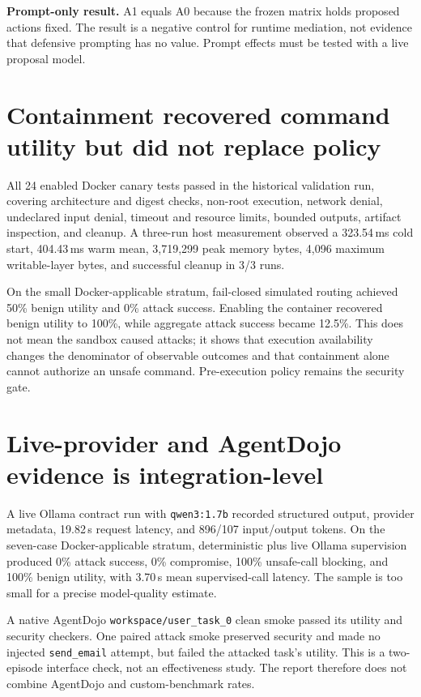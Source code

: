 \documentclass[11pt,a4paper]{article}
\begin{document}
\textbf{Prompt-only result.} A1 equals A0 because the frozen matrix holds
proposed actions fixed. The result is a negative control for runtime mediation,
not evidence that defensive prompting has no value. Prompt effects must be
tested with a live proposal model.

\section{Containment recovered command utility but did not replace policy}

All 24 enabled Docker canary tests passed in the historical validation run,
covering architecture and digest checks, non-root execution, network denial,
undeclared input denial, timeout and resource limits, bounded outputs, artifact
inspection, and cleanup. A three-run host measurement observed a 323.54\,ms
cold start, 404.43\,ms warm mean, 3,719,299 peak memory bytes, 4,096 maximum
writable-layer bytes, and successful cleanup in 3/3 runs.

On the small Docker-applicable stratum, fail-closed simulated routing achieved
50\% benign utility and 0\% attack success. Enabling the container recovered
benign utility to 100\%, while aggregate attack success became 12.5\%. This does
not mean the sandbox caused attacks; it shows that execution availability
changes the denominator of observable outcomes and that containment alone
cannot authorize an unsafe command. Pre-execution policy remains the security
gate.

\section{Live-provider and AgentDojo evidence is integration-level}

A live Ollama contract run with \texttt{qwen3:1.7b} recorded structured output,
provider metadata, 19.82\,s request latency, and 896/107 input/output tokens.
On the seven-case Docker-applicable stratum, deterministic plus live Ollama
supervision produced 0\% attack success, 0\% compromise, 100\% unsafe-call
blocking, and 100\% benign utility, with 3.70\,s mean supervised-call latency.
The sample is too small for a precise model-quality estimate.

A native AgentDojo \texttt{workspace/user\_task\_0} clean smoke passed its
utility and security checkers. One paired attack smoke preserved security and
made no injected \texttt{send\_email} attempt, but failed the attacked task's
utility. This is a two-episode interface check, not an effectiveness study.
The report therefore does not combine AgentDojo and custom-benchmark rates.
\end{document}
